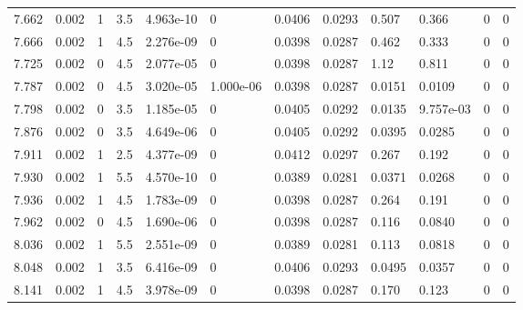 \documentclass[preview]{standalone}
\begin{document}
{{{{{\begin{tabular}{L{1.2cm}C{1.2cm} C{0.3cm}C{0.5cm} C{1.4cm}C{1.4cm} C{1.4cm}C{1.4cm} C{1.6cm}C{1.6cm} C{1.6cm}C{1.6cm}}
  7.662  &  0.002  & 1     & 3.5 &  4.963e-10  & 0  &  0.0406&   0.0293& 0.507 & 0.366   &  0 & 0  \\ 
  7.666  &  0.002  & 1     & 4.5 &  2.276e-09  & 0  &  0.0398&   0.0287& 0.462 & 0.333   &  0 & 0  \\ 
  7.725  &  0.002  & 0     & 4.5 &  2.077e-05  & 0  &  0.0398&   0.0287& 1.12 & 0.811   &  0 & 0  \\ 
  7.787  &  0.002  & 0     & 4.5 &  3.020e-05  & 1.000e-06  &  0.0398&   0.0287& 0.0151 & 0.0109   &  0 & 0  \\ 
  7.798  &  0.002  & 0     & 3.5 &  1.185e-05  & 0  &  0.0405&   0.0292& 0.0135 & 9.757e-03   &  0 & 0  \\ 
  7.876  &  0.002  & 0     & 3.5 &  4.649e-06  & 0  &  0.0405&   0.0292& 0.0395 & 0.0285   &  0 & 0  \\ 
  7.911  &  0.002  & 1     & 2.5 &  4.377e-09  & 0  &  0.0412&   0.0297& 0.267 & 0.192   &  0 & 0  \\ 
  7.930  &  0.002  & 1     & 5.5 &  4.570e-10  & 0  &  0.0389&   0.0281& 0.0371 & 0.0268   &  0 & 0  \\ 
  7.936  &  0.002  & 1     & 4.5 &  1.783e-09  & 0  &  0.0398&   0.0287& 0.264 & 0.191   &  0 & 0  \\ 
  7.962  &  0.002  & 0     & 4.5 &  1.690e-06  & 0  &  0.0398&   0.0287& 0.116 & 0.0840   &  0 & 0  \\ 
  8.036  &  0.002  & 1     & 5.5 &  2.551e-09  & 0  &  0.0389&   0.0281& 0.113 & 0.0818   &  0 & 0  \\ 
  8.048  &  0.002  & 1     & 3.5 &  6.416e-09  & 0  &  0.0406&   0.0293& 0.0495 & 0.0357   &  0 & 0  \\ 
  8.141  &  0.002  & 1     & 4.5 &  3.978e-09  & 0  &  0.0398&   0.0287& 0.170 & 0.123   &  0 & 0  \\ 
\hline 
\end{tabular} 

}}}}}
\end{document}
